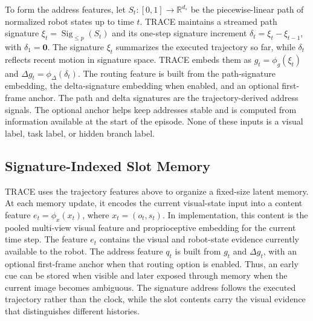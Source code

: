\documentclass{article}
\begin{document}
To form the address features, let $S_t:[0,1]\rightarrow\mathbb{R}^{d_s}$ be the piecewise-linear path of normalized robot states up to time $t$. TRACE maintains a streamed path signature $\xi_t=\operatorname{Sig}_{\leq p}(S_t)$ and its one-step signature increment $\delta_t=\xi_t-\xi_{t-1}$, with $\delta_1=\mathbf{0}$. The signature $\xi_t$ summarizes the executed trajectory so far, while $\delta_t$ reflects recent motion in signature space. TRACE embeds them as $g_t=\phi_g(\xi_t)$ and $\Delta g_t=\phi_{\Delta}(\delta_t)$. The routing feature is built from the path-signature embedding, the delta-signature embedding when enabled, and an optional first-frame anchor. The path and delta signatures are the trajectory-derived address signals. The optional anchor helps keep addresses stable and is computed from information available at the start of the episode. None of these inputs is a visual label, task label, or hidden branch label.


\subsection{Signature-Indexed Slot Memory}
\label{sec:method_signature}

TRACE uses the trajectory features above to organize a fixed-size latent memory. At each memory update, it encodes the current visual-state input into a content feature $e_t=\phi_x(x_t)$, where $x_t=(o_t,s_t)$. In implementation, this content is the pooled multi-view visual feature and proprioceptive embedding for the current time step. The feature $e_t$ contains the visual and robot-state evidence currently available to the robot. The address feature $q_t$ is built from $g_t$ and $\Delta g_t$, with an optional first-frame anchor when that routing option is enabled. Thus, an early cue can be stored when visible and later exposed through memory when the current image becomes ambiguous. The signature address follows the executed trajectory rather than the clock, while the slot contents carry the visual evidence that distinguishes different histories.
\end{document}
